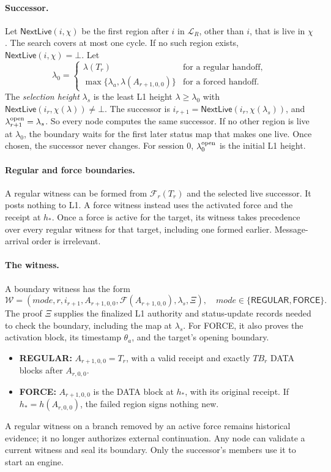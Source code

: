 \documentclass[11pt,a4paper]{article}
\newcommand{\FC}{\mathcal F}
\newcommand{\TB}{\mathit{TB}}
\newcommand{\tagg}[1]{\ensuremath{\mathsf{#1}}}
\begin{document}
\paragraph{Successor.}
Let $\tagg{NextLive}(i,\chi)$ be the first region after $i$ in
$\mathcal L_R$, other than $i$, that is live in $\chi$. The search covers
at most one cycle. If no such region exists,
$\tagg{NextLive}(i,\chi)=\bot$. Let
\[
 \lambda_0=\begin{cases}
 \lambda(T_r) & \text{for a regular handoff,}\\
 \max\{\lambda_a,\lambda(A_{r+1,0,0})\} & \text{for a forced handoff.}
 \end{cases}
\]
The \emph{selection height} $\lambda_s$ is the least L1 height
$\lambda\ge\lambda_0$ with $\tagg{NextLive}(i_r,\chi(\lambda))\ne\bot$.
The successor is $i_{r+1}=\tagg{NextLive}(i_r,\chi(\lambda_s))$, and
$\lambda^{\rm open}_{r+1}=\lambda_s$. So every node computes the same
successor. If no other region is live at $\lambda_0$, the boundary waits
for the first later status map that makes one live. Once chosen, the
successor never changes. For session $0$, $\lambda^{\rm open}_0$ is the
initial L1 height.

\paragraph{Regular and force boundaries.}
A regular witness can be formed from $\FC_r(T_r)$ and the selected live
successor. It posts nothing to L1. A force witness instead uses the
activated force and the receipt at $h_*$. Once a force is active for the
target, its witness takes precedence over every regular witness for that
target, including one formed earlier. Message-arrival order is irrelevant.

\paragraph{The witness.}
A boundary witness has the form
\[
 \mathcal W=(\mathit{mode},r,i_{r+1},A_{r+1,0,0},
 \FC(A_{r+1,0,0}),\lambda_s,\Xi),
 \quad \mathit{mode}\in\{\tagg{REGULAR},\tagg{FORCE}\}.
\]
The proof $\Xi$ supplies the finalized L1 authority and status-update
records needed to check the boundary, including the map at $\lambda_s$.
For FORCE, it also proves the activation block, its timestamp
$\theta_a$, and the target's opening boundary.
\begin{itemize}
\item \textbf{REGULAR:} $A_{r+1,0,0}=T_r$, with a valid receipt and
exactly $\TB_r$ DATA blocks after $A_{r,0,0}$.
\item \textbf{FORCE:} $A_{r+1,0,0}$ is the DATA block at $h_*$, with its
original receipt. If $h_*=h(A_{r,0,0})$, the failed region signs nothing
new.
\end{itemize}
A regular witness on a branch removed by an active force remains historical
evidence; it no longer authorizes external continuation. Any node can
validate a current witness and seal its boundary. Only the successor's
members use it to start an engine.
\end{document}
